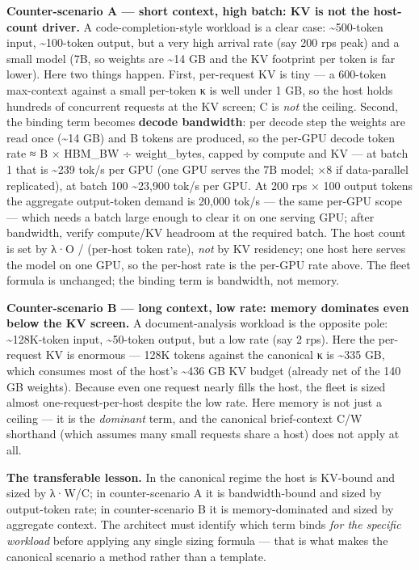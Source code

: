 \textbf{Counter-scenario A --- short context, high batch: KV is not the
host-count driver.} A code-completion-style workload is a clear case:
\textasciitilde500-token input, \textasciitilde100-token output, but a
very high arrival rate (say 200 rps peak) and a small model (7B, so
weights are \textasciitilde14 GB and the KV footprint per token is far
lower). Here two things happen. First, per-request KV is tiny --- a
600-token max-context against a small per-token κ is well under 1 GB, so
the host holds hundreds of concurrent requests at the KV screen; C is
\emph{not} the ceiling. Second, the binding term becomes \textbf{decode
bandwidth}: per decode step the weights are read once (\textasciitilde14
GB) and B tokens are produced, so the per-GPU decode token rate ≈ B ×
HBM\_BW ÷ weight\_bytes, capped by compute and KV --- at batch 1 that is
\textasciitilde239 tok/s per GPU (one GPU serves the 7B model; ×8 if
data-parallel replicated), at batch 100 \textasciitilde23,900 tok/s per
GPU. At 200 rps × 100 output tokens the aggregate output-token demand is
20,000 tok/s --- the same per-GPU scope --- which needs a batch large
enough to clear it on one serving GPU; after bandwidth, verify
compute/KV headroom at the required batch. The host count is set by λ·O
/ (per-host token rate), \emph{not} by KV residency; one host here
serves the model on one GPU, so the per-host rate is the per-GPU rate
above. The fleet formula is unchanged; the binding term is bandwidth,
not memory.

\textbf{Counter-scenario B --- long context, low rate: memory dominates
even below the KV screen.} A document-analysis workload is the opposite
pole: \textasciitilde128K-token input, \textasciitilde50-token output,
but a low rate (say 2 rps). Here the per-request KV is enormous --- 128K
tokens against the canonical κ is \textasciitilde335 GB, which consumes
most of the host's \textasciitilde436 GB KV budget (already net of the
140 GB weights). Because even one request nearly fills the host, the
fleet is sized almost one-request-per-host despite the low rate. Here
memory is not just a ceiling --- it is the \emph{dominant} term, and the
canonical brief-context C/W shorthand (which assumes many small requests
share a host) does not apply at all.

\textbf{The transferable lesson.} In the canonical regime the host is
KV-bound and sized by λ·W/C; in counter-scenario A it is bandwidth-bound
and sized by output-token rate; in counter-scenario B it is
memory-dominated and sized by aggregate context. The architect must
identify which term binds \emph{for the specific workload} before
applying any single sizing formula --- that is what makes the canonical
scenario a method rather than a template.


